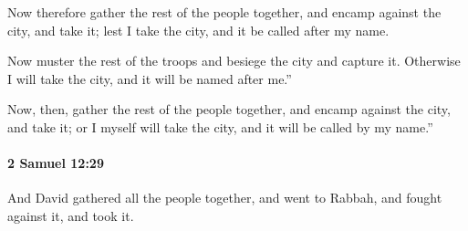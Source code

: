 			\begin{versebox}
					\item[BHS] 
					\item[ASV] Now therefore gather the rest of the people together, and encamp against the city, and take it; lest I take the city, and it be called after my name.
					\item[NIV] Now muster the rest of the troops and besiege the city and capture it. Otherwise I will take the city, and it will be named after me.”
					\item[NRSV] Now, then, gather the rest of the people together, and encamp against the city, and take it; or I myself will take the city, and it will be called by my name.”
			\end{versebox}

		\paragraph{2 Samuel 12:29} %
			\label{2SAMUEL-12-29}

			And David gathered all the people together, and went to Rabbah, and fought against it, and took it.

